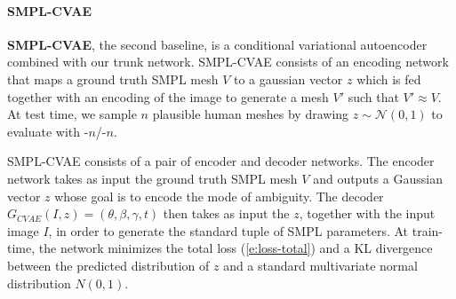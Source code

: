\paragraph{SMPL-CVAE} 

\textbf{SMPL-CVAE}, the second baseline, is a conditional variational autoencoder~\cite{sohn2015cvae} combined with our trunk network.
SMPL-CVAE consists of an encoding network that maps a ground truth SMPL mesh $V$ to a gaussian vector $z$ which is fed together with an encoding of the image to generate a mesh $V'$ such that $V' \approx V$. At test time, we sample $n$ plausible human meshes by drawing $z \sim \mathcal{N}(0, 1)$ to evaluate with \MPJPE-$n$/\RE-$n$.

SMPL-CVAE consists of a pair of encoder and decoder networks. The encoder network takes as input the ground truth SMPL mesh $V$ and outputs a Gaussian vector $z$ whose goal is to encode the mode of ambiguity. The decoder $G_{CVAE}(I, z) = (\theta, \beta, \gamma, t)$ then takes as input the $z$, together with the input image $I$, in order to generate the standard tuple of SMPL parameters. At train-time, the network minimizes the total loss (\ref{e:loss-total}) and a KL divergence between the predicted distribution of $z$ and a standard multivariate normal distribution $N(0,1)$.




